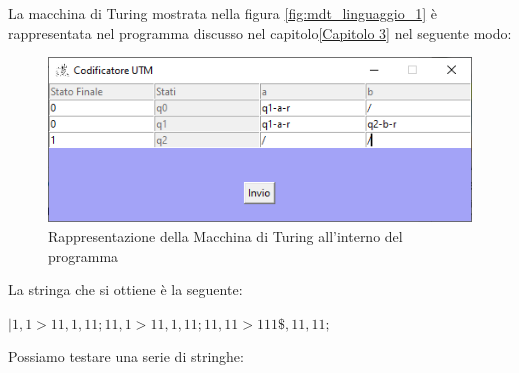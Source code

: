 \documentclass[a4paper,12pt,titlepage,oneside]{book}
\begin{document}
La macchina di Turing mostrata nella figura \ref{fig:mdt_linguaggio_1} è rappresentata nel programma discusso nel capitolo\ref{Capitolo 3} nel seguente modo:

\begin{figure}[!ht]
	\centering
	\includegraphics[width=.8\textwidth]{Images/mdt_linguaggio_1_programma.png}
	\caption{Rappresentazione della Macchina di Turing all'interno del programma}
	\label{fig:mdt_linguaggio_1_programma}
\end{figure}

La stringa che si ottiene è la seguente:

\begin{center}
	$|1,1>11,1,11;11,1>11,1,11;11,11>111\$,11,11;$
\end{center}

Possiamo testare una serie di stringhe:
\end{document}
